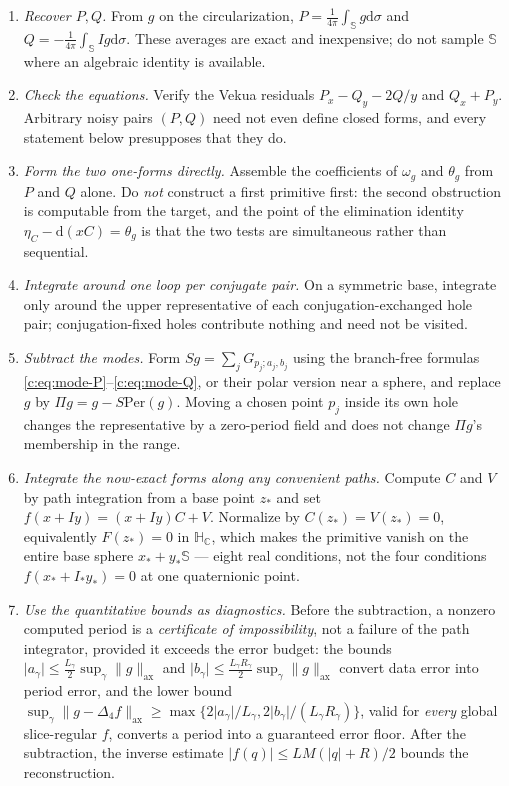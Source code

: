 \documentclass[11pt,a4paper]{article}
\numberwithin{equation}{section}
\theoremstyle{definition}
\theoremstyle{remark}
\theoremstyle{plain}
\newcommand{\HC}{\mathbb H_{\mathbb C}}
\newcommand{\SSS}{\mathbb S}
\newcommand{\lap}{\Delta_4}
\newcommand{\om}{\omega}
\newcommand{\thet}{\theta}
\newcommand{\etaC}{\eta_{C}}
\newcommand{\Per}{\mathrm{Per}}
\newcommand{\pot}{C}          %
\newcommand{\potV}{V}         %
\newcommand{\axn}[1]{\lVert #1\rVert_{\mathrm{ax}}}   %
\newcommand{\abs}[1]{\lvert #1\rvert}
\newcommand{\dd}{\mathrm d}
\begin{document}
\begin{enumerate}[label=\textup{\arabic*.}]
\item \emph{Recover $P,Q$.} From $g$ on the circularization,
$P=\frac1{4\pi}\int_\SSS g\dd\sigma$ and
$Q=-\frac1{4\pi}\int_\SSS Ig\dd\sigma$. These averages are exact and
inexpensive; do not sample $\SSS$ where an algebraic identity is available.
\item \emph{Check the equations.} Verify the Vekua residuals
$P_x-Q_y-2Q/y$ and $Q_x+P_y$. Arbitrary noisy pairs $(P,Q)$ need not even
define closed forms, and every statement below presupposes that they do.
\item \emph{Form the two one-forms directly.} Assemble the coefficients of
$\om_g$ and $\thet_g$ from $P$ and $Q$ alone. Do \emph{not} construct a
first primitive first: the second obstruction is computable from the target,
and the point of the elimination identity $\etaC-\dd(x\pot)=\thet_g$ is
that the two tests are simultaneous rather than sequential.
\item \emph{Integrate around one loop per conjugate pair.} On a symmetric
base, integrate only around the upper representative of each
conjugation-exchanged hole pair; conjugation-fixed holes contribute nothing
and need not be visited.
\item \emph{Subtract the modes.} Form $Sg=\sum_jG_{p_j;a_j,b_j}$ using the
branch-free formulas \eqref{c:eq:mode-P}--\eqref{c:eq:mode-Q},
or their polar version near a sphere, and replace $g$ by $\Pi g=g-S\Per(g)$.
Moving a chosen point $p_j$ inside its own hole changes the representative
by a zero-period field and does not change $\Pi g$'s membership in the
range.
\item \emph{Integrate the now-exact forms along any convenient paths.}
Compute $\pot$ and $\potV$ by path integration from a base point $z_*$ and
set $f(x+Iy)=(x+Iy)\pot+\potV$. Normalize by $\pot(z_*)=\potV(z_*)=0$,
equivalently $F(z_*)=0$ in $\HC$, which makes the primitive vanish on the
entire base sphere $x_*+y_*\SSS$ --- eight real conditions, not the four
conditions $f(x_*+I_*y_*)=0$ at one quaternionic point.
\item \emph{Use the quantitative bounds as diagnostics.} Before the
subtraction, a nonzero computed period is a \emph{certificate of
impossibility}, not a failure of the path integrator, provided it exceeds
the error budget: the bounds
$\abs{a_\gamma}\le\frac{L_\gamma}{2}\sup_\gamma\axn g$ and
$\abs{b_\gamma}\le\frac{L_\gamma R_\gamma}{2}\sup_\gamma\axn g$ convert data
error into period error, and the lower bound
$\sup_\gamma\axn{g-\lap f}\ge\max\{2\abs{a_\gamma}/L_\gamma,
2\abs{b_\gamma}/(L_\gamma R_\gamma)\}$, valid for \emph{every} global
slice-regular $f$, converts a period into a guaranteed error floor. After
the subtraction, the inverse estimate
$\abs{f(q)}\le LM(\abs q+R)/2$ bounds the reconstruction.
\end{enumerate}
\end{document}
